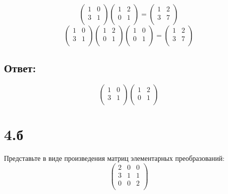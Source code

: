 \documentclass[a4paper]{article}
\begin{document}
\begin{equation*}
\begin{pmatrix}
1 & 0\\
3 & 1\\
\end{pmatrix}
\begin{pmatrix}
1 & 2\\
0 & 1\\
\end{pmatrix} = 
\begin{pmatrix}
1 & 2\\
3 & 7\\
\end{pmatrix}
\end{equation*}
\begin{equation*}
\begin{pmatrix}
1 & 0\\
3 & 1\\
\end{pmatrix}
\begin{pmatrix}
1 & 2\\
0 & 1\\
\end{pmatrix}
\begin{pmatrix}
1 & 0\\
0 & 1\\
\end{pmatrix} = 
\begin{pmatrix}
1 & 2\\
3 & 7\\
\end{pmatrix}
\end{equation*}
\subsection*{Ответ:}
\begin{equation*}
\begin{pmatrix}
1 & 0\\
3 & 1\\
\end{pmatrix}
\begin{pmatrix}
1 & 2\\
0 & 1\\
\end{pmatrix}
\end{equation*}



\section*{4.б}
Представьте в виде произведения матриц элементарных преобразований:
\begin{equation*}
\begin{pmatrix}
2 & 0 & 0\\
3 & 1 & 1\\
0 & 0 & 2\\
\end{pmatrix}
\end{equation*}
\end{document}
